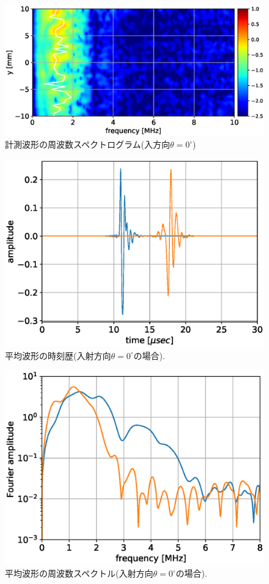 \begin{figure}[h]
	\begin{center}
	\includegraphics[width=0.7\linewidth]{Figs/fig7.eps} 
	\end{center}
	\caption{
		計測波形の周波数スペクトログラム(入方向$\theta=0^{\circ}$)
	} 
	\label{fig:fig7}
\end{figure}
\begin{figure}[h]
	\begin{center}
	\includegraphics[width=0.6\linewidth]{Figs/fig8.eps} 
	\end{center}
	\caption{
		平均波形の時刻歴(入射方向$\theta=0^{\circ}$の場合).
	} 
	\label{fig:fig8}
\end{figure}
\begin{figure}[h]
	\begin{center}
	\includegraphics[width=0.6\linewidth]{Figs/fig9.eps} 
	\end{center}
	\caption{
		平均波形の周波数スペクトル(入射方向$\theta=0^{\circ}の場合$).
	} 
	\label{fig:fig9}
\end{figure}
